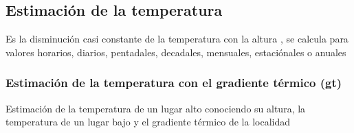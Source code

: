 \subsection{Estimación de la temperatura}
\begin{definition}
    Es la disminución casi constante de la temperatura con la altura , se calcula para valores horarios, diarios, pentadales, decadales, mensuales, estaciónales o anuales
\end{definition}
\subsubsection{Estimación de la temperatura con el gradiente térmico (gt)}
Estimación de la temperatura de un lugar alto conociendo su altura, la temperatura de un lugar bajo y el gradiente térmico de la localidad

